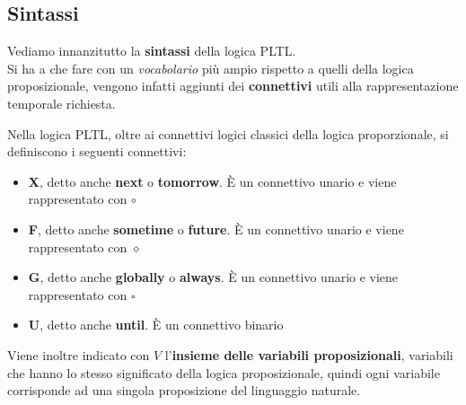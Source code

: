 \documentclass[a4paper,12pt, oneside]{book}
\begin{document}
\subsection{Sintassi}
Vediamo innanzitutto la \textbf{sintassi} della logica PLTL.\\
Si ha a che fare con un \textit{vocabolario} più ampio rispetto a quelli della
logica proposizionale, vengono infatti aggiunti dei \textbf{connettivi} utili
alla rappresentazione temporale richiesta.
\begin{definizione}
  Nella logica PLTL, oltre ai connettivi logici classici della logica
  proporzionale, si definiscono i seguenti connettivi:
  \begin{itemize}
    \item \textbf{X}, detto anche \textbf{next} o \textbf{tomorrow}. È un
    connettivo unario e viene rappresentato con $\circ$
    \item \textbf{F}, detto anche \textbf{sometime} o \textbf{future}. È un
    connettivo unario e viene rappresentato con $\diamond$
    \item \textbf{G}, detto anche \textbf{globally} o \textbf{always}. È un
    connettivo unario e viene rappresentato con $\square$
    \item \textbf{U}, detto anche \textbf{until}. È un connettivo binario
  \end{itemize}
  Viene inoltre indicato con $V$ l'\textbf{insieme delle variabili
    proposizionali}, variabili che hanno lo stesso significato della logica
  proposizionale, quindi ogni variabile corrisponde ad una singola proposizione
  del linguaggio naturale. 
\end{definizione}
\end{document}
